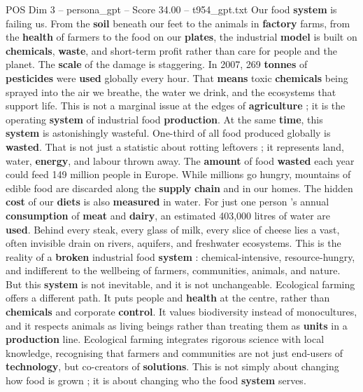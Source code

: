 \begin{textsample}{POS Dim 3 – persona\_gpt – Score 34.00 – t954\_gpt.txt}  \label{ex:f3_pos_022}
Our food \textbf{system} is failing us.
From the \textbf{soil} beneath our feet to the animals in \textbf{factory} farms, from the \textbf{health} of farmers to the food on our \textbf{plates}, the industrial \textbf{model} is built on \textbf{chemicals}, \textbf{waste}, and short-term profit rather than care for people and the planet.
The \textbf{scale} of the damage is staggering.
In 2007, 269 \textbf{tonnes} of \textbf{pesticides} were \textbf{used} globally every hour.
That \textbf{means} toxic \textbf{chemicals} being sprayed into the air we breathe, the water we drink, and the ecosystems that support life.
This is not a marginal issue at the edges of \textbf{agriculture} ; it is the operating \textbf{system} of industrial food \textbf{production}.
At the same \textbf{time}, this \textbf{system} is astonishingly wasteful.
One-third of all food produced globally is \textbf{wasted}.
That is not just a statistic about rotting leftovers ; it represents land, water, \textbf{energy}, and labour thrown away.
The \textbf{amount} of food \textbf{wasted} each year could feed 149 million people in Europe.
While millions go hungry, mountains of edible food are discarded along the \textbf{supply} \textbf{chain} and in our homes.
The hidden \textbf{cost} of our \textbf{diets} is also \textbf{measured} in water.
For just one person ’s annual \textbf{consumption} of \textbf{meat} and \textbf{dairy}, an estimated 403,000 litres of water are \textbf{used}.
Behind every steak, every glass of milk, every slice of cheese lies a vast, often invisible drain on rivers, aquifers, and freshwater ecosystems.
This is the reality of a \textbf{broken} industrial food \textbf{system} : chemical-intensive, resource-hungry, and indifferent to the wellbeing of farmers, communities, animals, and nature.
But this \textbf{system} is not inevitable, and it is not unchangeable.
Ecological farming offers a different path.
It puts people and \textbf{health} at the centre, rather than \textbf{chemicals} and corporate \textbf{control}.
It values biodiversity instead of monocultures, and it respects animals as living beings rather than treating them as \textbf{units} in a \textbf{production} line.
Ecological farming integrates rigorous science with local knowledge, recognising that farmers and communities are not just end-users of \textbf{technology}, but co-creators of \textbf{solutions}.
This is not simply about changing how food is grown ; it is about changing who the food \textbf{system} serves.

\end{textsample}

